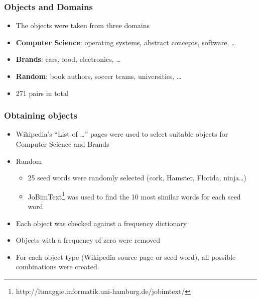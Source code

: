 \documentclass[11pt,aspectratio=169,usenames,dvipsnames]{beamer}
\begin{document}
    \begin{frame}[t]
        \frametitle{Objects and Domains}
        \begin{itemize}
            \item The objects were taken from three domains
            \item \textbf{Computer Science}: operating systems, abstract concepts, software, \ldots
            \item \textbf{Brands}: cars, food, electronics, \ldots
            \item \textbf{Random}: book authors, soccer teams, universities, \ldots
            \item 271 pairs in total

        \end{itemize}
    \end{frame}

    \begin{frame}[t]
        \frametitle{Obtaining objects}
        \begin{itemize}
            \item Wikipedia's \enquote{List of \ldots} pages were used to select suitable objects for Computer Science and Brands\pause
            \item Random
            \begin{itemize}
                \item 25 seed words were randomly selected (cork, Hamster, Florida, ninja\ldots)
                \item JoBimText\footnote{http://ltmaggie.informatik.uni-hamburg.de/jobimtext/} was used to find the 10 most similar words for each seed word
            \end{itemize}\pause
            \item Each object was checked against a frequency dictionary
            \item Objects with a frequency of zero were removed
            \item For each object type (Wikipedia source page or seed word), all possible combinations were created.
        \end{itemize}

    \end{frame}
\end{document}
